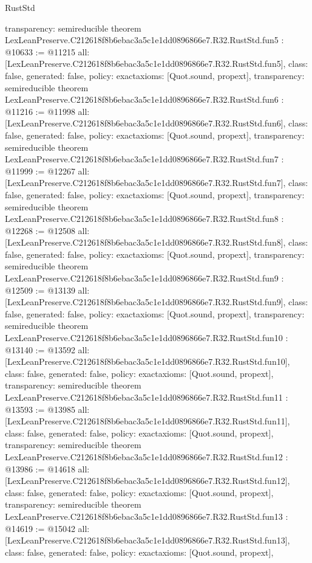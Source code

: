 \begin{lexlean}{RustStd}
\begin{coremodule}
{  transparency: semireducible
}
theorem LexLeanPreserve.C212618f8b6ebac3a5c1e1dd0896866e7.R32.RustStd.fun5 : @10633 := @11215 {
  all: [LexLeanPreserve.C212618f8b6ebac3a5c1e1dd0896866e7.R32.RustStd.fun5],
  class: false,
  generated: false,
  policy: exact{axioms: [Quot.sound, propext]},
  transparency: semireducible
}
theorem LexLeanPreserve.C212618f8b6ebac3a5c1e1dd0896866e7.R32.RustStd.fun6 : @11216 := @11998 {
  all: [LexLeanPreserve.C212618f8b6ebac3a5c1e1dd0896866e7.R32.RustStd.fun6],
  class: false,
  generated: false,
  policy: exact{axioms: [Quot.sound, propext]},
  transparency: semireducible
}
theorem LexLeanPreserve.C212618f8b6ebac3a5c1e1dd0896866e7.R32.RustStd.fun7 : @11999 := @12267 {
  all: [LexLeanPreserve.C212618f8b6ebac3a5c1e1dd0896866e7.R32.RustStd.fun7],
  class: false,
  generated: false,
  policy: exact{axioms: [Quot.sound, propext]},
  transparency: semireducible
}
theorem LexLeanPreserve.C212618f8b6ebac3a5c1e1dd0896866e7.R32.RustStd.fun8 : @12268 := @12508 {
  all: [LexLeanPreserve.C212618f8b6ebac3a5c1e1dd0896866e7.R32.RustStd.fun8],
  class: false,
  generated: false,
  policy: exact{axioms: [Quot.sound, propext]},
  transparency: semireducible
}
theorem LexLeanPreserve.C212618f8b6ebac3a5c1e1dd0896866e7.R32.RustStd.fun9 : @12509 := @13139 {
  all: [LexLeanPreserve.C212618f8b6ebac3a5c1e1dd0896866e7.R32.RustStd.fun9],
  class: false,
  generated: false,
  policy: exact{axioms: [Quot.sound, propext]},
  transparency: semireducible
}
theorem LexLeanPreserve.C212618f8b6ebac3a5c1e1dd0896866e7.R32.RustStd.fun10 : @13140 := @13592 {
  all: [LexLeanPreserve.C212618f8b6ebac3a5c1e1dd0896866e7.R32.RustStd.fun10],
  class: false,
  generated: false,
  policy: exact{axioms: [Quot.sound, propext]},
  transparency: semireducible
}
theorem LexLeanPreserve.C212618f8b6ebac3a5c1e1dd0896866e7.R32.RustStd.fun11 : @13593 := @13985 {
  all: [LexLeanPreserve.C212618f8b6ebac3a5c1e1dd0896866e7.R32.RustStd.fun11],
  class: false,
  generated: false,
  policy: exact{axioms: [Quot.sound, propext]},
  transparency: semireducible
}
theorem LexLeanPreserve.C212618f8b6ebac3a5c1e1dd0896866e7.R32.RustStd.fun12 : @13986 := @14618 {
  all: [LexLeanPreserve.C212618f8b6ebac3a5c1e1dd0896866e7.R32.RustStd.fun12],
  class: false,
  generated: false,
  policy: exact{axioms: [Quot.sound, propext]},
  transparency: semireducible
}
theorem LexLeanPreserve.C212618f8b6ebac3a5c1e1dd0896866e7.R32.RustStd.fun13 : @14619 := @15042 {
  all: [LexLeanPreserve.C212618f8b6ebac3a5c1e1dd0896866e7.R32.RustStd.fun13],
  class: false,
  generated: false,
  policy: exact{axioms: [Quot.sound, propext]},
}
\end{coremodule}
\end{lexlean}
